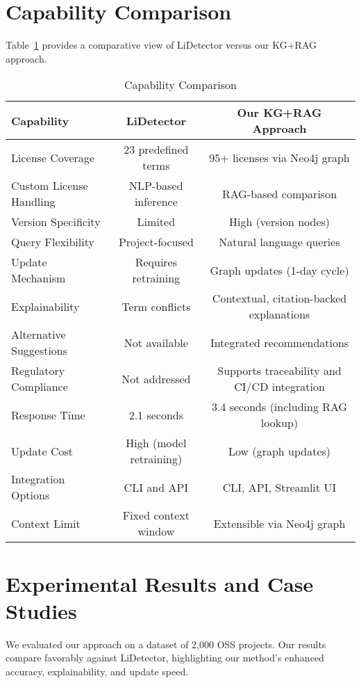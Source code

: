 \documentclass[12pt]{article}
\begin{document}
\section{Capability Comparison}
\label{sec:capability_comparison}
Table~\ref{tab:capability_comparison} provides a comparative view of LiDetector versus our KG+RAG approach.

\begin{table}[!ht]
\centering
\caption{Capability Comparison}
\begin{tabular}{|l|c|c|}
\hline
\textbf{Capability} & \textbf{LiDetector} & \textbf{Our KG+RAG Approach} \\
\hline
License Coverage        & 23 predefined terms & 95+ licenses via Neo4j graph \\
Custom License Handling & NLP-based inference & RAG-based comparison \\
Version Specificity     & Limited             & High (version nodes)  \\
Query Flexibility       & Project-focused     & Natural language queries \\
Update Mechanism        & Requires retraining & Graph updates (1-day cycle)  \\
Explainability          & Term conflicts      & Contextual, citation-backed explanations \\
Alternative Suggestions & Not available       & Integrated recommendations \\
Regulatory Compliance   & Not addressed       & Supports traceability and CI/CD integration \\
Response Time          & 2.1 seconds & 3.4 seconds (including RAG lookup) \\
Update Cost            & High (model retraining) & Low (graph updates) \\
Integration Options    & CLI and API & CLI, API, Streamlit UI \\
Context Limit          & Fixed context window & Extensible via Neo4j graph \\
\hline
\end{tabular}
\label{tab:capability_comparison}
\end{table}

\section{Experimental Results and Case Studies}
\label{sec:experiments}
We evaluated our approach on a dataset of 2,000 OSS projects. Our results compare favorably against LiDetector, highlighting our method's enhanced accuracy, explainability, and update speed.
\end{document}
